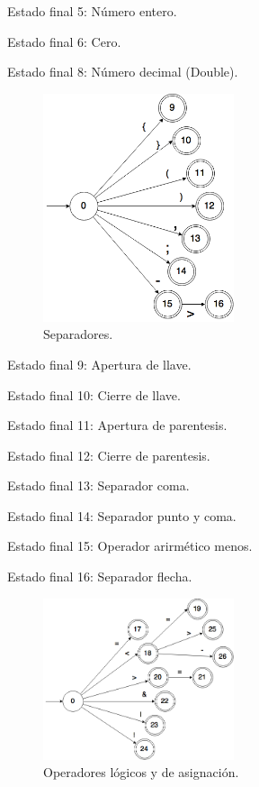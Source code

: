 \documentclass[11pt]{article}
\begin{document}
Estado final 5: Número entero.

Estado final 6: Cero.

Estado final 8: Número decimal (Double).

\begin{figure}[H]
\centering
\includegraphics[width=0.5\textwidth]{./DiagramasAutomata/img/separadoresBueno.png}
\caption{Separadores.} \label{fig:sepa}
\end{figure}

Estado final 9: Apertura de llave.

Estado final 10: Cierre de llave.

Estado final 11: Apertura de parentesis.

Estado final 12: Cierre de parentesis.

Estado final 13: Separador coma.

Estado final 14: Separador punto y coma.

Estado final 15: Operador arirmético menos.

Estado final 16: Separador flecha.

\begin{figure}[H]
\centering
\includegraphics[width=0.5\textwidth]{./DiagramasAutomata/img/OperadoresLogYAsig.png}
\caption{Operadores lógicos y de asignación.} \label{fig:Log}
\end{figure}
\end{document}

